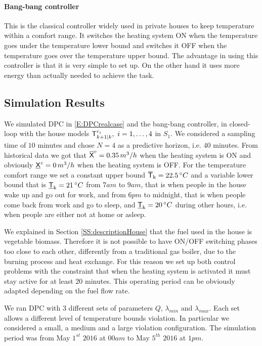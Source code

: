 \paragraph{Bang-bang controller}
This is the classical controller widely used in private houses to keep temperature within a comfort range. It switches the heating system ON when the temperature goes under the temperature lower bound and switches it OFF when the temperature goes over the temperature upper bound. The advantage in using this controller is that it is very simple to set up. On the other hand it uses more energy than actually needed to achieve the task.

\subsection{Simulation Results}\label{SS:simulationResults} We simulated  DPC in \eqref{E:DPCrealcase} and the bang-bang controller, in closed-loop with the house models $\mathsf{T}^{r_i}_{k+1|k},\ i=1,\ldots,4$ in $S_1$. We considered a sampling time of $10$ minutes and chose $N=4$ as a predictive horizon, i.e. $40$ minutes. From historical data we got that $\overline{\mathsf{X}}^c = 0.35 \, m^3/h$ when the heating system is ON and obviously $\underline{\mathsf{X}}^c = 0 \, m^3/h$ when the heating system is OFF. For the temperature comfort range we set a constant upper bound $\overline{\mathsf{T}}_{\mathrm{k}} = 22.5 \, \degree C$ and a variable lower bound that is $\underline{\mathsf{T}}_{\mathrm{k}} = 21 \, \degree C$ from $7am$ to $9am$, that is when people in the house wake up and go out for work, and from $6pm$ to midnight, that is when people come back from work and go to sleep, and $\underline{\mathsf{T}}_{\mathrm{k}} = 20 \, \degree C$ during other hours, i.e. when people are either not at home or asleep.

We explained in Section \ref{SS:descriptionHouse} that the fuel used in the house is vegetable biomass. Therefore it is not possible to have ON/OFF switching phases too close to each other, differently from a traditional gas boiler, due to the burning process and heat exchange. For this reason we set up both control problems with the constraint that when the heating system is activated it must stay active for at least $20$ minutes. This operating period can be obviously adapted depending on the fuel flow rate.

We ran DPC with $3$ different sets of parameters $Q$, $\lambda_{min}$ and $\lambda_{max}$. Each set allows a different level of temperature bounds violation. In particular we considered a small, a medium and a large violation configuration. The simulation period was from May $1^{st}$ $2016$ at $00am$ to May $5^{th}$ $2016$ at $1pm$.
